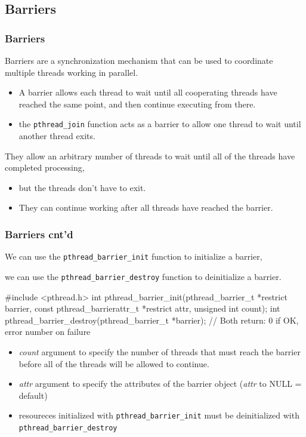 \documentclass[newPxFont,sthlmFooter,nooffset]{beamer}
\begin{document}
\subsection{Barriers}
\begin{frame}[t]
  \frametitle{Barriers}
Barriers are a synchronization mechanism that can be used to coordinate multiple threads working in parallel.
\begin{itemize}
\item A barrier allows each thread to wait until all cooperating
  threads have reached the same point, and then continue executing
  from there.
\item the \texttt{pthread\_join} function acts as a barrier to allow
  one thread to wait until another thread exits.
\end{itemize}
They allow an arbitrary number of threads to wait until all of the threads have completed processing,
\begin{itemize}
\item but the threads don’t have to exit.
\item They can continue working after all threads have reached the
  barrier.
\end{itemize}

\end{frame}

\begin{frame}[t, fragile]
  \frametitle{Barriers cnt'd}
We can use the \texttt{pthread\_barrier\_init} function to initialize a barrier,

we can use the \texttt{pthread\_barrier\_destroy} function to deinitialize a barrier.
\begin{codedef}
#include <pthread.h>
int pthread_barrier_init(pthread_barrier_t *restrict barrier,
                         const pthread_barrierattr_t *restrict attr,
                         unsigned int count);
int pthread_barrier_destroy(pthread_barrier_t *barrier);
// Both return: 0 if OK, error number on failure
\end{codedef}

\begin{itemize}
\item \textit{count} argument to specify the number of threads that must reach the barrier before all of the threads will be allowed to continue.
\item \textit{attr} argument to specify the attributes of the barrier object
(\textit{attr} to NULL = default)
\item resoureces initialized with \texttt{pthread\_barrier\_init} must be deinitialized with \texttt{pthread\_barrier\_destroy}
\end{itemize}

\end{frame}
\end{document}
